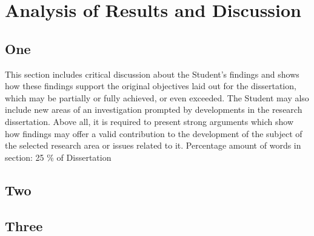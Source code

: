 
\chapter{Analysis of Results and Discussion}
\begin{spacing}{2.0}

\section{One}
This section includes critical discussion about the Student’s findings and shows how these findings support the original objectives laid out for the dissertation, which may be partially or
fully achieved, or even exceeded. The Student may also include new areas of an investigation prompted by developments in the research dissertation. Above all, it is required to present strong arguments which show how findings may offer a valid contribution to the development of the subject of the selected research area or issues related to it. Percentage amount of words in section: 25 \% of Dissertation

\section{Two}

\section{Three}


\end{spacing}
\newpage
